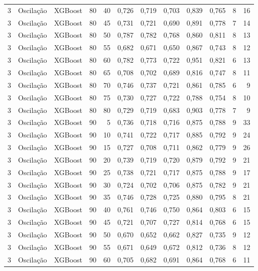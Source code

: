 \begin{longtable}{@{}rllrrrrrrrrr@{}}
3 & Oscilação & XGBoost & 80 & 40 & 0,726 & 0,719 & 0,703 & 0,839 & 0,765 & 8 & 16 \\
3 & Oscilação & XGBoost & 80 & 45 & 0,731 & 0,721 & 0,690 & 0,891 & 0,778 & 7 & 14 \\
3 & Oscilação & XGBoost & 80 & 50 & 0,787 & 0,782 & 0,768 & 0,860 & 0,811 & 8 & 13 \\
3 & Oscilação & XGBoost & 80 & 55 & 0,682 & 0,671 & 0,650 & 0,867 & 0,743 & 8 & 12 \\
3 & Oscilação & XGBoost & 80 & 60 & 0,782 & 0,773 & 0,722 & 0,951 & 0,821 & 6 & 13 \\
3 & Oscilação & XGBoost & 80 & 65 & 0,708 & 0,702 & 0,689 & 0,816 & 0,747 & 8 & 11 \\
3 & Oscilação & XGBoost & 80 & 70 & 0,746 & 0,737 & 0,721 & 0,861 & 0,785 & 6 & 9 \\
3 & Oscilação & XGBoost & 80 & 75 & 0,730 & 0,727 & 0,722 & 0,788 & 0,754 & 8 & 10 \\
3 & Oscilação & XGBoost & 80 & 80 & 0,729 & 0,719 & 0,683 & 0,903 & 0,778 & 7 & 9 \\
3 & Oscilação & XGBoost & 90 & 5 & 0,736 & 0,718 & 0,716 & 0,875 & 0,788 & 9 & 33 \\
3 & Oscilação & XGBoost & 90 & 10 & 0,741 & 0,722 & 0,717 & 0,885 & 0,792 & 9 & 24 \\
3 & Oscilação & XGBoost & 90 & 15 & 0,727 & 0,708 & 0,711 & 0,862 & 0,779 & 9 & 26 \\
3 & Oscilação & XGBoost & 90 & 20 & 0,739 & 0,719 & 0,720 & 0,879 & 0,792 & 9 & 21 \\
3 & Oscilação & XGBoost & 90 & 25 & 0,738 & 0,721 & 0,717 & 0,875 & 0,788 & 9 & 17 \\
3 & Oscilação & XGBoost & 90 & 30 & 0,724 & 0,702 & 0,706 & 0,875 & 0,782 & 9 & 21 \\
3 & Oscilação & XGBoost & 90 & 35 & 0,746 & 0,728 & 0,725 & 0,880 & 0,795 & 8 & 21 \\
3 & Oscilação & XGBoost & 90 & 40 & 0,761 & 0,746 & 0,750 & 0,864 & 0,803 & 6 & 15 \\
3 & Oscilação & XGBoost & 90 & 45 & 0,721 & 0,707 & 0,727 & 0,814 & 0,768 & 6 & 15 \\
3 & Oscilação & XGBoost & 90 & 50 & 0,670 & 0,652 & 0,662 & 0,827 & 0,735 & 9 & 12 \\
3 & Oscilação & XGBoost & 90 & 55 & 0,671 & 0,649 & 0,672 & 0,812 & 0,736 & 8 & 12 \\
3 & Oscilação & XGBoost & 90 & 60 & 0,705 & 0,682 & 0,691 & 0,864 & 0,768 & 6 & 11 \\

\end{longtable}

